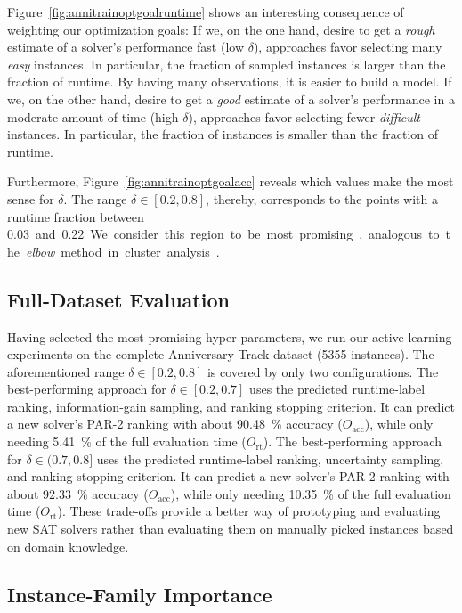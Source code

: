\documentclass[runningheads]{llncs}
\begin{document}
Figure~\ref{fig:annitrainoptgoalruntime} shows an interesting consequence of weighting our optimization goals:
If we, on the one hand, desire to get a \emph{rough} estimate of a solver's performance fast (low $\delta$), approaches favor selecting many \emph{easy} instances.
In particular, the fraction of sampled instances is larger than the fraction of runtime.
By having many observations, it is easier to build a model.
If we, on the other hand, desire to get a \emph{good} estimate of a solver's performance in a moderate amount of time (high $\delta$), approaches favor selecting fewer \emph{difficult} instances.
In particular, the fraction of instances is smaller than the fraction of runtime.

Furthermore, Figure~\ref{fig:annitrainoptgoalacc} reveals which values make the most sense for $\delta$.
The range $\delta \in \left[0.2, 0.8\right]$, thereby, corresponds to the points with a runtime fraction between \SI{0.03} and \SI{0.22}.
We consider this region to be most promising, analogous to the \emph{elbow} method in cluster analysis~\cite{kodinariya2013review}.

\subsection{Full-Dataset Evaluation}

Having selected the most promising hyper-parameters, we run our active-learning experiments on the complete Anniversary Track dataset (5355 instances).
The aforementioned range $\delta \in \left[0.2, 0.8\right]$ is covered by only two configurations.
The best-performing approach for $\delta \in \left[0.2, 0.7\right]$ uses the predicted runtime-label ranking, information-gain sampling, and ranking stopping criterion.
It can predict a new solver's PAR-2 ranking with about \SI{90.48}{\%} accuracy ($O_{\operatorname{acc}}$), while only needing \SI{5.41}{\%} of the full evaluation time ($O_{\operatorname{rt}}$).
The best-performing approach for $\delta \in (0.7, 0.8]$ uses the predicted runtime-label ranking, uncertainty sampling, and ranking stopping criterion.
It can predict a new solver's PAR-2 ranking with about \SI{92.33}{\%} accuracy ($O_{\operatorname{acc}}$), while only needing \SI{10.35}{\%} of the full evaluation time ($O_{\operatorname{rt}}$).
These trade-offs provide a better way of prototyping and evaluating new SAT solvers rather than evaluating them on manually picked instances based on domain knowledge.

\subsection{Instance-Family Importance}
\end{document}
